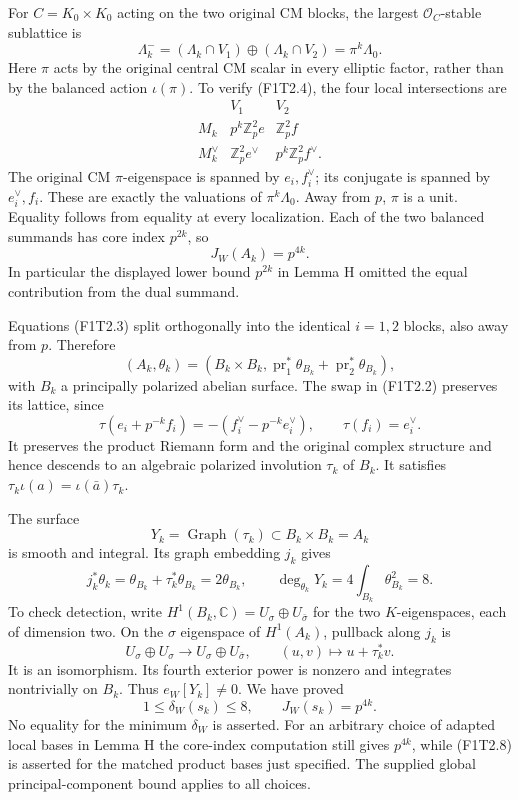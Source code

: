 For $C=K_0\times K_0$ acting on the two original CM blocks,
the largest $\mathcal O_C$-stable sublattice is
\[
 \Lambda_k^-=(\Lambda_k\cap V_1)\oplus(\Lambda_k\cap V_2)
            =\pi^k\Lambda_0.
 \tag{F1T2.4}
\]
Here $\pi$ acts by the original central CM scalar in every
elliptic factor, rather than by the balanced action $\iota(\pi)$.
To verify (F1T2.4), the four local intersections are
\[
 \begin{array}{c|cc}
 &V_1&V_2\\ \hline
 M_k&p^k\mathbb Z_p^2e&\mathbb Z_p^2f\\
 M_k^\vee&\mathbb Z_p^2e^\vee&p^k\mathbb Z_p^2f^\vee.
 \end{array}                                                    \tag{F1T2.5}
\]
The original CM $\pi$-eigenspace is spanned by $e_i,f_i^\vee$;
its conjugate is spanned by $e_i^\vee,f_i$.
These are exactly the valuations of $\pi^k\Lambda_0$.
Away from $p$, $\pi$ is a unit. Equality follows from equality
at every localization. Each of the two balanced summands has core
index $p^{2k}$, so
\[
 \boxed{J_W(A_k)=p^{4k}.}                                    \tag{F1T2.6}
\]
In particular the displayed lower bound $p^{2k}$ in Lemma H
omitted the equal contribution from the dual summand.

Equations (F1T2.3) split orthogonally into the identical $i=1,2$
blocks, also away from $p$. Therefore
\[
 (A_k,\theta_k)=(B_k\times B_k,
                     \operatorname{pr}_1^*\theta_{B_k}
                     +\operatorname{pr}_2^*\theta_{B_k}),
 \tag{F1T2.7}
\]
with $B_k$ a principally polarized abelian surface.
The swap in (F1T2.2) preserves its lattice, since
\[
 \tau(e_i+p^{-k}f_i)=-(f_i^\vee-p^{-k}e_i^\vee),\qquad
 \tau(f_i)=e_i^\vee.
\]
It preserves the product Riemann form and the original complex
structure and hence descends to an algebraic polarized involution
$\tau_k$ of $B_k$. It satisfies
$\tau_k\iota(a)=\iota(\bar a)\tau_k$.

The surface
\[
 Y_k=\operatorname{Graph}(\tau_k)\subset B_k\times B_k=A_k
 \tag{F1T2.8}
\]
is smooth and integral. Its graph embedding $j_k$ gives
\[
 j_k^*\theta_k=\theta_{B_k}+\tau_k^*\theta_{B_k}
             =2\theta_{B_k},\qquad
 \deg_{\theta_k}Y_k=4\int_{B_k}\theta_{B_k}^2=8.
 \tag{F1T2.9}
\]
To check detection, write $H^1(B_k,\mathbb C)=U_\sigma\oplus
U_{\bar\sigma}$ for the two $K$-eigenspaces, each of dimension two.
On the $\sigma$ eigenspace of $H^1(A_k)$, pullback along $j_k$ is
\[
 U_\sigma\oplus U_\sigma\longrightarrow
       U_\sigma\oplus U_{\bar\sigma},\qquad
       (u,v)\longmapsto u+\tau_k^*v.
 \tag{F1T2.10}
\]
It is an isomorphism. Its fourth exterior power is nonzero and
integrates nontrivially on $B_k$. Thus $e_W[Y_k]\ne0$.
We have proved
\[
 \boxed{1\le\delta_W(s_k)\le8,\qquad J_W(s_k)=p^{4k}.}
 \tag{F1T2.11}
\]
No equality for the minimum $\delta_W$ is asserted.
For an arbitrary choice of adapted local bases in Lemma H the
core-index computation still gives $p^{4k}$, while (F1T2.8) is
asserted for the matched product bases just specified. The supplied
global principal-component bound applies to all choices.


